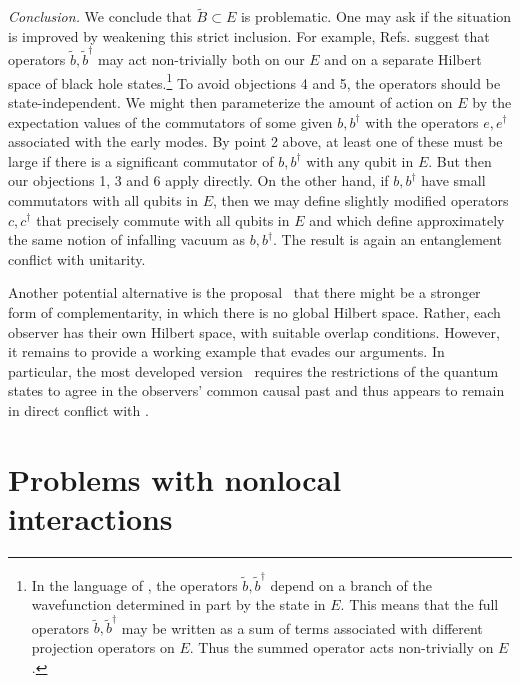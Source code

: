 \documentclass[12pt]{article}
\newcommand{\sect}[1]{\section{#1}\setcounter{equation}{0}}
\begin{document}
{{\it Conclusion.} We conclude that $\tilde{B} \subset E$ is problematic.  One may ask if the situation is improved by weakening this strict inclusion.  For example, Refs. \cite{Nomura:2012sw,Nomura2,Nomura3} suggest that operators
$\tilde{b},\tilde{b}^\dagger$ may act non-trivially both on our $E$ and on a separate Hilbert space of black hole states.\footnote{In the language of \cite{Nomura:2012sw,Nomura2,Nomura3}, the operators $\tilde{b},\tilde{b}^\dagger$ depend on a branch of the wavefunction determined in part by the state in $E$.  This means that the full operators $\tilde{b},\tilde{b}^\dagger$ may be written as a sum of terms associated with different projection operators on $E$.  Thus the summed operator acts non-trivially on $E$.} To avoid objections 4 and 5, the operators should be state-independent. We might then parameterize the amount of action on $E$ by the expectation values of the commutators of some given $b, b^\dagger$ with the operators $e,e^\dagger$ associated with the early modes.  By point 2 above, at least one of these must be large if there is a significant commutator of
$b, b^\dagger$ with any qubit in $E$.  But then our objections 1, 3 and 6 apply directly. On the other hand, if $b, b^\dagger$ have small commutators with all qubits in $E$, then we may define slightly modified operators $c, c^\dagger$ that precisely commute with all qubits in $E$ and which define approximately the same notion of infalling vacuum as $b, b^\dagger$.  The result is again an entanglement conflict with unitarity.

Another potential alternative is the proposal~\cite{Bousso:2012as,Banks:2012nn,Harlow:2013tf,Susskind:2013tg} that there might be a stronger form of complementarity, in which there is no global Hilbert space.  Rather, each observer has their own Hilbert space, with suitable overlap conditions.  However, it remains to provide a working example that evades our arguments.  In particular, the most developed version~\cite{Banks:2012nn} requires the restrictions of the quantum states to agree in the observers' common causal past and thus appears to remain in direct conflict with \cite{Almheiri:2012rt}.

\sect{Problems with nonlocal interactions}
\label{noNL}


}
\end{document}
